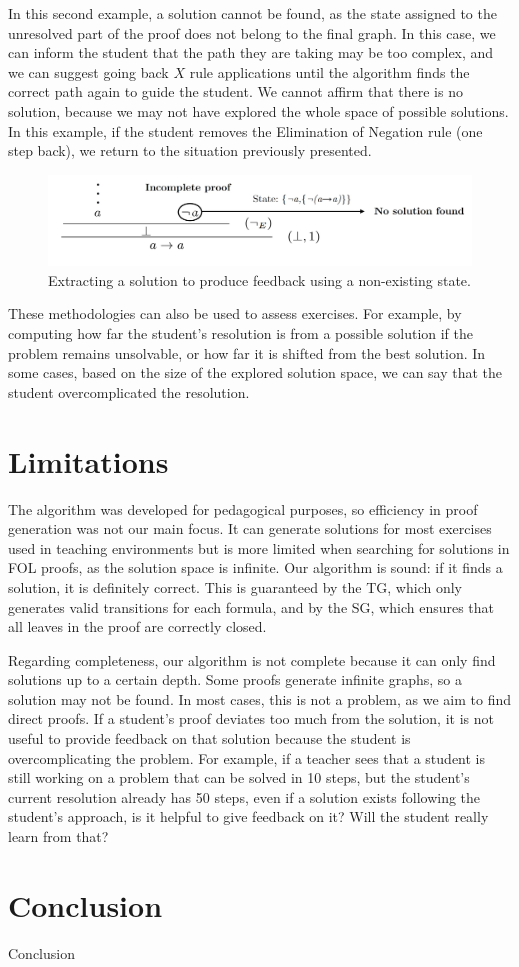 \documentclass[runningheads]{llncs}
\begin{document}
In this second example, a solution cannot be found, as the state assigned to the unresolved part of the proof does not belong to the final graph. In this case, we can inform the student that the path they are taking may be too complex, and we can suggest going back \(X\) rule applications until the algorithm finds the correct path again to guide the student. We cannot affirm that there is no solution, because we may not have explored the whole space of possible solutions. In this example, if the student removes the Elimination of Negation rule (one step back), we return to the situation previously presented.

\begin{figure}
    \centering
    \includegraphics[width=1\linewidth]{resources/trim-neg-feed.jpg}
    \caption{Extracting a solution to produce feedback using a non-existing state.}
    \label{fig:extract-solution2}
\end{figure}

These methodologies can also be used to assess exercises. For example, by computing how far the student’s resolution is from a possible solution if the problem remains unsolvable, or how far it is shifted from the best solution. In some cases, based on the size of the explored solution space, we can say that the student overcomplicated the resolution.

\section{Limitations}
The algorithm was developed for pedagogical purposes, so efficiency in proof generation was not our main focus. It can generate solutions for most exercises used in teaching environments but is more limited when searching for solutions in FOL proofs, as the solution space is infinite. Our algorithm is sound: if it finds a solution, it is definitely correct. This is guaranteed by the TG, which only generates valid transitions for each formula, and by the SG, which ensures that all leaves in the proof are correctly closed.

Regarding completeness, our algorithm is not complete because it can only find solutions up to a certain depth. Some proofs generate infinite graphs, so a solution may not be found. In most cases, this is not a problem, as we aim to find direct proofs. If a student’s proof deviates too much from the solution, it is not useful to provide feedback on that solution because the student is overcomplicating the problem. For example, if a teacher sees that a student is still working on a problem that can be solved in 10 steps, but the student’s current resolution already has 50 steps, even if a solution exists following the student’s approach, is it helpful to give feedback on it? Will the student really learn from that? 


\section{Conclusion}
Conclusion


\end{document}
